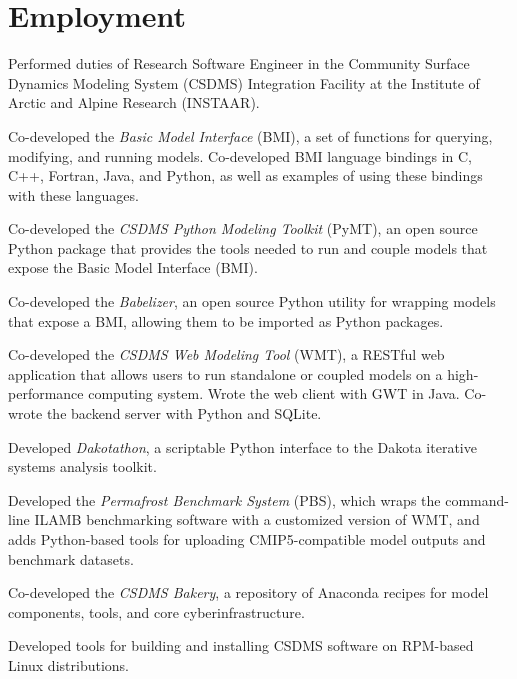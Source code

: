 \section{Employment}
\vspace{0.5em}

\begin{compactitem}[\itembullet]
  \item
    Performed duties of Research Software Engineer in the Community
    Surface Dynamics Modeling System (CSDMS) Integration Facility at
    the Institute of Arctic and Alpine Research (INSTAAR).
  \item
    Co-developed the \textit{Basic Model Interface} (BMI), a set of functions
    for querying, modifying, and running models. Co-developed BMI language
    bindings in C, C++, Fortran, Java, and Python, as well as examples of using
    these bindings with these languages.
  \item
    Co-developed the \textit{CSDMS Python Modeling Toolkit} (PyMT), an
    open source Python package that provides the tools needed to run
    and couple models that expose the Basic Model Interface (BMI).
  \item
    Co-developed the \textit{Babelizer}, an open source Python utility for
    wrapping models that expose a BMI, allowing them to be imported as Python
    packages.
  \item
    Co-developed the \textit{CSDMS Web Modeling Tool} (WMT), a RESTful
    web application that allows users to run standalone or coupled
    models on a high-performance computing system. Wrote the web
    client with GWT in Java. Co-wrote the backend server with Python
    and SQLite.
  \item
    Developed \textit{Dakotathon}, a scriptable Python interface to
    the Dakota iterative systems analysis toolkit.
  \item    
    Developed the \textit{Permafrost Benchmark System} (PBS), which
    wraps the command-line ILAMB benchmarking software with a
    customized version of WMT, and adds Python-based tools for
    uploading CMIP5-compatible model outputs and benchmark datasets.
  \item
    Co-developed the \textit{CSDMS Bakery}, a repository of Anaconda recipes
    for model components, tools, and core cyberinfrastructure.
  \item
    Developed tools for building and installing CSDMS software on
    RPM-based Linux distributions.

\end{compactitem}
